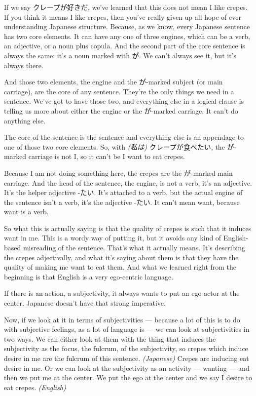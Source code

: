 If we say クレープが好きだ, we've learned that this does not mean I like crepes. If you think it means I like crepes, then you've really given up all hope of ever understanding Japanese structure. Because, as we know, every Japanese sentence has two core elements. It can have any one of three engines, which can be a verb, an adjective, or a noun plus copula. And the second part of the core sentence is always the same: it's a noun marked with が. We can't always see it, but it's always there.

{}

And those two elements, the engine and the が-marked subject (or main carriage), are the core of any sentence. They're the only things we need in a sentence. We've got to have those two, and everything else in a logical clause is telling us more about either the engine or the が-marked carriage. It can't do anything else.

{}

The core of the sentence is the sentence and everything else is an appendage to one of those two core elements. So, with {\em (私は)} クレープが食べたい, the が-marked carriage is not I, so it can't be I want to eat crepes.

{}

Because I am not doing something here, the crepes are the が-marked main carriage. And the head of the sentence, the engine, is not a verb, it's an adjective. It's the helper adjective -たい. It's attached to a verb, but the actual engine of the sentence isn't a verb, it's the adjective -たい. It can't mean want, because want is a verb.

So what this is actually saying is that the quality of crepes is such that it induces want in me. This is a wordy way of putting it, but it avoids any kind of English-based misreading of the sentence. That's what it actually means. It's describing the crepes adjectivally, and what it's saying about them is that they have the quality of making me want to eat them. And what we learned right from the beginning is that English is a very ego-centric language.

If there is an action, a subjectivity, it always wants to put an ego-actor at the center. Japanese doesn't have that strong imperative.

{}

Now, if we look at it in terms of subjectivities --- because a lot of this is to do with subjective feelings, as a lot of language is --- we can look at subjectivities in two ways. We can either look at them with the thing that induces the subjectivity as the focus, the fulcrum, of the subjectivity, so crepes which induce desire in me are the fulcrum of this sentence. {\em (Japanese)} Crepes are inducing eat desire in me. Or we can look at the subjectivity as an activity --- wanting --- and then we put me at the center. We put the ego at the center and we say I desire to eat crepes. {\em (English)}

